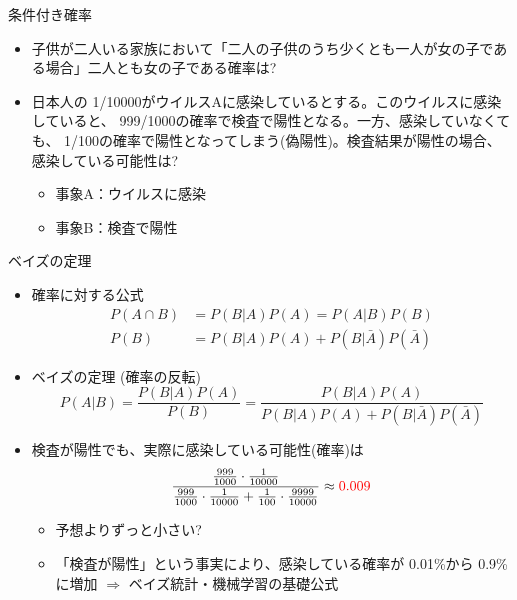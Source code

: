 \documentclass[dvipdfmx]{beamer}
\begin{document}
\begin{frame}[t,fragile]{条件付き確率}
  \begin{itemize}
    \setlength{\itemsep}{1em}
  \item 子供が二人いる家族において「二人の子供のうち少くとも一人が女の子である場合」二人とも女の子である確率は?
  \item 日本人の{\color{red} 1/10000}がウイルスAに感染しているとする。このウイルスに感染していると、{\color{red} 999/1000}の確率で検査で陽性となる。一方、感染していなくても、{\color{red} 1/100}の確率で陽性となってしまう(偽陽性)。検査結果が陽性の場合、感染している可能性は?
    \begin{itemize}
    \item 事象A：ウイルスに感染
    \item 事象B：検査で陽性
    \end{itemize}
  \end{itemize}
\end{frame}

\begin{frame}[t,fragile]{ベイズの定理}
  \begin{itemize}
    \setlength{\itemsep}{1em}
  \item 確率に対する公式
    \begin{align*}
      P(A \cap B) &= P(B|A) P(A) = P(A|B) P(B) \\ P(B) &= P(B|A) P(A) + P(B|\bar{A}) P(\bar{A})
    \end{align*}
  \item ベイズの定理 (確率の反転)
    \[
    P(A|B) = \frac{P(B|A)P(A)}{P(B)} = \frac{P(B|A)P(A)}{P(B|A) P(A) + P(B|\bar{A}) P(\bar{A})}
    \]
  \item 検査が陽性でも、実際に感染している可能性(確率)は
    \[
    \frac{\frac{999}{1000} \cdot \frac{1}{10000}}{\frac{999}{1000} \cdot \frac{1}{10000} + \frac{1}{100} \cdot \frac{9999}{10000}} \approx {\color{red} 0.009}
    \]
    \begin{itemize}
    \item 予想よりずっと小さい?
    \item 「検査が陽性」という事実により、感染している確率が 0.01\%から 0.9\%に増加 $\Rightarrow$ ベイズ統計・機械学習の基礎公式
    \end{itemize}
  \end{itemize}
\end{frame}
\end{document}
